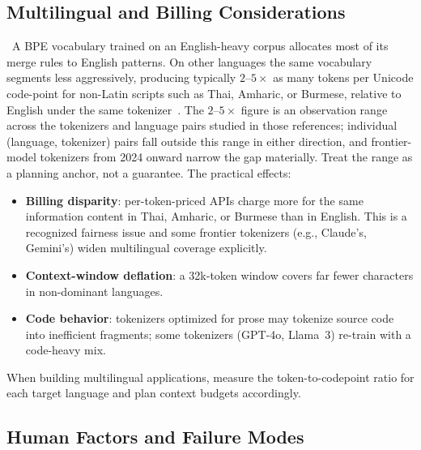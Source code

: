 \subsection{Multilingual and Billing Considerations}

\Emp~A BPE vocabulary trained on an English-heavy corpus allocates most of
its merge rules to English patterns. On other languages the same
vocabulary segments less aggressively, producing typically $2$--$5\times$
as many tokens per Unicode code-point for non-Latin scripts such as
Thai, Amharic, or Burmese, relative to English under the same
tokenizer~\citep{ahia2023languages,petrov2023language}. The $2$--$5\times$
figure is an observation range across the tokenizers and language pairs
studied in those references; individual (language, tokenizer) pairs
fall outside this range in either direction, and frontier-model
tokenizers from 2024 onward narrow the gap materially. Treat the range
as a planning anchor, not a guarantee. The practical effects:
\begin{itemize}
  \item \textbf{Billing disparity}: per-token-priced APIs charge more
        for the same information content in Thai, Amharic, or Burmese
        than in English. This is a recognized fairness issue and
        some frontier tokenizers (e.g., Claude's, Gemini's) widen
        multilingual coverage explicitly.
  \item \textbf{Context-window deflation}: a 32k-token window covers
        far fewer characters in non-dominant languages.
  \item \textbf{Code behavior}: tokenizers optimized for prose may
        tokenize source code into inefficient fragments; some
        tokenizers (GPT-4o, Llama~3) re-train with a code-heavy mix.
\end{itemize}
When building multilingual applications, measure the token-to-codepoint
ratio for each target language and plan context budgets accordingly.

\subsection{Human Factors and Failure Modes}

